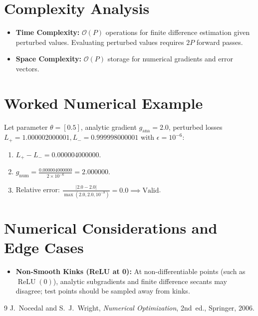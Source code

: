 \documentclass[11pt]{article}
\begin{document}
\section{Complexity Analysis}
\label{sec:complexity}

\begin{itemize}
    \item \textbf{Time Complexity:} $\mathcal{O}(P)$ operations for finite difference estimation given perturbed values. Evaluating perturbed values requires $2P$ forward passes.
    \item \textbf{Space Complexity:} $\mathcal{O}(P)$ storage for numerical gradients and error vectors.
\end{itemize}

\section{Worked Numerical Example}
\label{sec:worked_example}

Let parameter $\theta = [0.5]$, analytic gradient $g_{\mathrm{ana}} = 2.0$, perturbed losses $L_+ = 1.000002000001, L_- = 0.999998000001$ with $\epsilon = 10^{-6}$:
\begin{enumerate}
    \item $L_+ - L_- = 0.000004000000$.
    \item $g_{\mathrm{num}} = \frac{0.000004000000}{2 \times 10^{-6}} = 2.000000$.
    \item Relative error: $\frac{|2.0 - 2.0|}{\max(2.0, 2.0, 10^{-8})} = 0.0 \implies \text{Valid}$.
\end{enumerate}

\section{Numerical Considerations and Edge Cases}
\label{sec:numerical}

\begin{itemize}
    \item \textbf{Non-Smooth Kinks (ReLU at 0):} At non-differentiable points (such as $\operatorname{ReLU}(0)$), analytic subgradients and finite difference secants may disagree; test points should be sampled away from kinks.
\end{itemize}

\begin{thebibliography}{9}
 J.~Nocedal and S.~J.~Wright, \emph{Numerical Optimization}, 2nd~ed., Springer, 2006.
\end{thebibliography}
\end{document}
